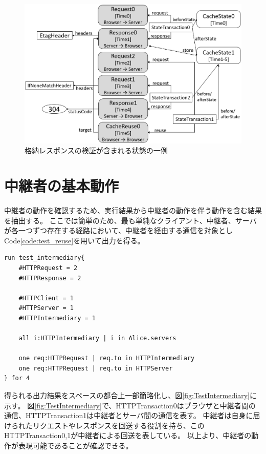\documentclass[12pt,a4paper]{jbook}
\begin{document}
\begin{figure}[htb]
\centering
\includegraphics[width=450pt]{./fig/TestVerification.eps}
\caption{格納レスポンスの検証が含まれる状態の一例}
\label{fig:TestVerification}
\end{figure}

\section{中継者の基本動作}
中継者の動作を確認するため、実行結果から中継者の動作を伴う動作を含む結果を抽出する。
ここでは簡単のため、最も単純なクライアント、中継者、サーバが各一つずつ存在する経路において、中継者を経由する通信を対象としCode\ref{code:test_reuse}を用いて出力を得る。

\begin{lstlisting}[caption=中継者の動作, label=code:test_intermediary]
run test_intermediary{
	#HTTPRequest = 2
	#HTTPResponse = 2

	#HTTPClient = 1
	#HTTPServer = 1
	#HTTPIntermediary = 1

	all i:HTTPIntermediary | i in Alice.servers

	one req:HTTPRequest | req.to in HTTPIntermediary
	one req:HTTPRequest | req.to in HTTPServer
} for 4
\end{lstlisting}

得られる出力結果をスペースの都合上一部簡略化し、図\ref{fig:TestIntermediary}に示す。
図\ref{fig:TestIntermediary}で、HTTPTransaction0はブラウザと中継者間の通信、HTTPTransaction1は中継者とサーバ間の通信を表す。
中継者は自身に届けられたリクエストやレスポンスを回送する役割を持ち、このHTTPTransaction0,1が中継者による回送を表している。
以上より、中継者の動作が表現可能であることが確認できる。
\end{document}
